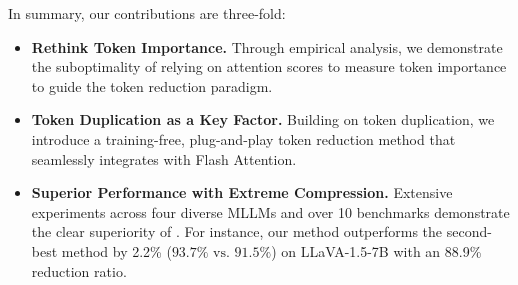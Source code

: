 In summary, our contributions  are three-fold:
\begin{itemize}[leftmargin=10pt, topsep=0pt, itemsep=1pt, partopsep=1pt, parsep=1pt]
    \item \textbf{Rethink Token Importance.} Through empirical analysis, we demonstrate the suboptimality of relying on attention scores to measure token importance to guide the token reduction paradigm.
    \item \textbf{Token Duplication as a Key Factor.} Building on token duplication, we introduce a training-free, plug-and-play token reduction method that seamlessly integrates with Flash Attention.
    \item \textbf{Superior Performance with Extreme Compression.} Extensive experiments across four diverse MLLMs and over 10 benchmarks demonstrate the clear superiority of \algname. For instance, our method outperforms the second-best method by 2.2\% ($93.7\% \text{ vs. } 91.5\%$) on LLaVA-1.5-7B with an 88.9\% reduction ratio.
\end{itemize}





